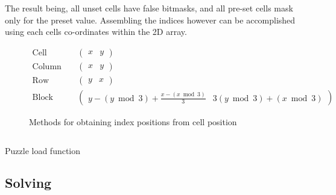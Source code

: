         The result being, all unset cells have false bitmasks, 
        and all pre-set cells mask only for the preset value.
        Assembling the indices however can be accomplished using
        each cells co-ordinates within the 2D array.

        \begin{figure}[!h]
            \centering
            \begin{eqnarray*}
                \text{Cell position:} & & \begin{pmatrix}
                    x & y
                \end{pmatrix}\\
                \text{Column index:} & & \begin{pmatrix}
                    x & y
                \end{pmatrix}\\
                \text{Row index:} & & \begin{pmatrix}
                    y & x
                \end{pmatrix}\\
                \text{Block index:} & &
                \begin{pmatrix}
                    y - (y \bmod 3) + \frac{x - (x \bmod 3)}{3} & 3(y \bmod 3) + (x \bmod 3)
                \end{pmatrix}
            \end{eqnarray*}
            \caption{Methods for obtaining index positions from cell position}
        \end{figure}

        \begin{listing}[H]
            \inputminted[gobble=4, firstline=21, lastline=36]{cpp}{../Sudoku/SudokuPuzzle.cpp}
            \caption{Puzzle load function}
        \end{listing}

    \subsection*{Solving}